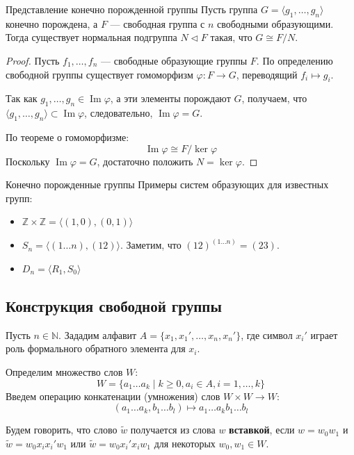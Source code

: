 \begin{Proposition}{Представление конечно порожденной группы}{}
	Пусть группа $G = \langle g_1, \dots, g_n \rangle$ конечно порождена, а $F$ — свободная группа с $n$ свободными образующими. Тогда существует нормальная подгруппа $N \triangleleft F$ такая, что $G \cong F/N$.
\end{Proposition}

\begin{proof}
	Пусть $f_1, \dots, f_n$ — свободные образующие группы $F$. По определению свободной группы существует гомоморфизм $\varphi: F \to G$, переводящий $f_i \mapsto g_i$.
	
	Так как $g_1, \dots, g_n \in \operatorname{Im} \varphi$, а эти элементы порождают $G$, получаем, что $\langle g_1, \dots, g_n \rangle \subset \operatorname{Im} \varphi$, следовательно, $\operatorname{Im} \varphi = G$.
	
	По теореме о гомоморфизме:
	\[ \operatorname{Im} \varphi \cong F / \ker \varphi \]
	Поскольку $\operatorname{Im} \varphi = G$, достаточно положить $N = \ker \varphi$.
\end{proof}

\begin{Example}{Конечно порожденные группы}{}
	Примеры систем образующих для известных групп:
	\begin{itemize}
		\item $\mathbb{Z} \times \mathbb{Z} = \langle (1,0), (0,1) \rangle$
		\item $S_n = \langle (1 \dots n), (12) \rangle$. Заметим, что $(12)^{(1 \dots n)} = (23)$.
		\item $D_n = \langle R_1, S_0 \rangle$
	\end{itemize}
\end{Example}

\subsection{Конструкция свободной группы}

Пусть $n \in \mathbb{N}$. Зададим алфавит $A = \{x_1, x_1', \dots, x_n, x_n'\}$, где символ $x_i'$ играет роль формального обратного элемента для $x_i$.

Определим множество слов $W$:
\[ W = \{a_1 \dots a_k \mid k \ge 0, a_i \in A, i = 1, \dots, k\} \]
Введем операцию конкатенации (умножения) слов $W \times W \to W$:
\[ (a_1 \dots a_k, b_1 \dots b_l) \mapsto a_1 \dots a_k b_1 \dots b_l \]

Будем говорить, что слово $\widetilde{w}$ получается из слова $w$ \textbf{вставкой}, если $w = w_0 w_1$ и $\widetilde{w} = w_0 x_i x_i' w_1$ или $\widetilde{w} = w_0 x_i' x_i w_1$ для некоторых $w_0, w_1 \in W$.

